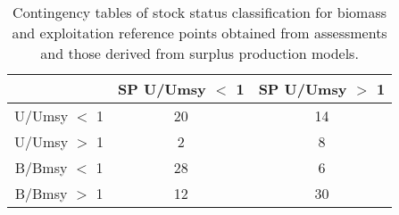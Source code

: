 \begin{table}[ht]
\begin{center}
\begin{tabular}{ccc}
  \hline
 & SP U/Umsy $<$ 1 & SP U/Umsy $>$ 1 \\ 
  \hline
U/Umsy $<$ 1 &  20 &  14 \\ 
  U/Umsy $>$ 1 &   2 &   8 \\ 
  B/Bmsy $<$ 1 &  28 &   6 \\ 
  B/Bmsy $>$ 1 &  12 &  30 \\ 
   \hline
\end{tabular}
\caption{Contingency tables of stock status classification for biomass and exploitation reference points obtained from assessments and those derived from surplus production models. }
\label{tab:contingency}
\end{center}
\end{table}
